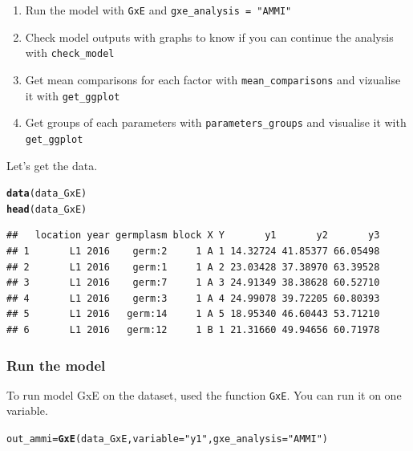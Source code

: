 \documentclass{article}\usepackage[]{graphicx}\usepackage[]{color}
\makeatletter
\newcommand{\hlstr}[1]{\textcolor[rgb]{0.192,0.494,0.8}{#1}}%
\newcommand{\hlstd}[1]{\textcolor[rgb]{0.345,0.345,0.345}{#1}}%
\newcommand{\hlkwb}[1]{\textcolor[rgb]{0.69,0.353,0.396}{#1}}%
\newcommand{\hlkwc}[1]{\textcolor[rgb]{0.333,0.667,0.333}{#1}}%
\newcommand{\hlkwd}[1]{\textcolor[rgb]{0.737,0.353,0.396}{\textbf{#1}}}%
\newenvironment{kframe}{%
 \def\at@end@of@kframe{}%
 \ifinner\ifhmode%
  \def\at@end@of@kframe{\end{minipage}}%
  \begin{minipage}{\columnwidth}%
 \fi\fi%
 \def\FrameCommand##1{\hskip\@totalleftmargin \hskip-\fboxsep
 \colorbox{shadecolor}{##1}\hskip-\fboxsep
     \hskip-\linewidth \hskip-\@totalleftmargin \hskip\columnwidth}%
 \MakeFramed {\advance\hsize-\width
   \@totalleftmargin\z@ \linewidth\hsize
   \@setminipage}}%
 {\par\unskip\endMakeFramed%
 \at@end@of@kframe}
\newenvironment{knitrout}{}{} %
\makeatother
\begin{document}
\begin{enumerate}
\item Run the model with \texttt{GxE} and \texttt{gxe\_analysis = "AMMI"}
\item Check model outputs with graphs to know if you can continue the analysis with \texttt{check\_model}
\item Get mean comparisons for each factor with \texttt{mean\_comparisons} and vizualise it with \texttt{get\_ggplot}
\item Get groups of each parameters with \texttt{parameters\_groups} and visualise it with \texttt{get\_ggplot}
\end{enumerate}

Let's get the data.

\begin{knitrout}
\color{fgcolor}\begin{kframe}
\begin{alltt}
\hlkwd{data}\hlstd{(data_GxE)}
\hlkwd{head}\hlstd{(data_GxE)}
\end{alltt}
\begin{verbatim}
##   location year germplasm block X Y       y1       y2       y3
## 1       L1 2016    germ:2     1 A 1 14.32724 41.85377 66.05498
## 2       L1 2016    germ:1     1 A 2 23.03428 37.38970 63.39528
## 3       L1 2016    germ:7     1 A 3 24.91349 38.38628 60.52710
## 4       L1 2016    germ:3     1 A 4 24.99078 39.72205 60.80393
## 5       L1 2016   germ:14     1 A 5 18.95340 46.60443 53.71210
## 6       L1 2016   germ:12     1 B 1 21.31660 49.94656 60.71978
\end{verbatim}
\end{kframe}
\end{knitrout}


\subsubsection{Run the model}
To run model GxE on the dataset, used the function \texttt{GxE}.
You can run it on one variable.

\begin{knitrout}
\color{fgcolor}\begin{kframe}
\begin{alltt}
\hlstd{out_ammi} \hlkwb{=} \hlkwd{GxE}\hlstd{(data_GxE,} \hlkwc{variable} \hlstd{=} \hlstr{"y1"}\hlstd{,} \hlkwc{gxe_analysis} \hlstd{=} \hlstr{"AMMI"}\hlstd{)}
\end{alltt}


{\ttfamily\noindent\itshape\color{messagecolor}{\#\# AMMI model done for y1}}\end{kframe}
\end{knitrout}
\end{document}
